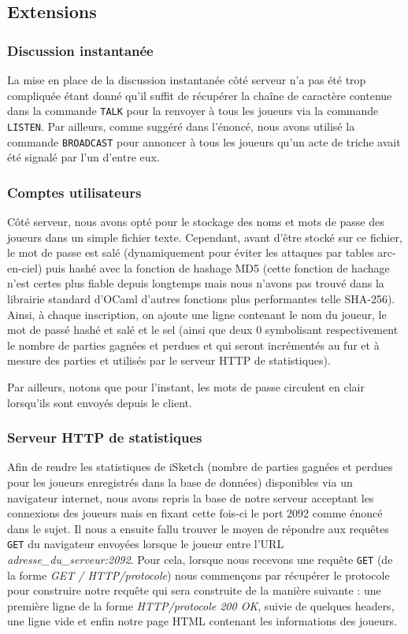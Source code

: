 \documentclass[a4paper, 11pt]{article}
\begin{document}
\subsection {Extensions}

\subsubsection{Discussion instantanée}

La mise en place de la discussion instantanée côté serveur n’a pas
été trop compliquée étant donné qu’il suffit de récupérer la chaîne de
caractère contenue dans la commande \verb+TALK+ pour la renvoyer à
tous les joueurs via la commande \verb+LISTEN+. Par ailleurs, comme
suggéré dans l’énoncé, nous avons utilisé la commande
\verb+BROADCAST+ pour annoncer à tous les joueurs qu’un acte de triche
avait été signalé par l’un d’entre eux.

\subsubsection {Comptes utilisateurs}

Côté serveur, nous avons opté pour le stockage des noms et mots de
passe des joueurs dans un simple fichier texte. Cependant, avant
d'être stocké sur ce fichier, le mot de passe est salé (dynamiquement
pour éviter les attaques par tables arc-en-ciel) puis hashé avec la
fonction de hashage MD5 (cette fonction de hachage n'est certes plus
fiable depuis longtemps mais nous n’avons pas trouvé dans la librairie
standard d'OCaml d’autres fonctions plus performantes telle SHA-256).
Ainsi, à chaque inscription, on ajoute une ligne contenant le nom du
joueur, le mot de passé hashé et salé et le sel (ainsi que deux 0
symbolisant respectivement le nombre de parties gagnées et perdues et
qui seront incrémentés au fur et à mesure des parties et utilisés par
le serveur HTTP de statistiques).

\bigskip Par ailleurs, notons que pour l’instant, les mots de passe
circulent en clair lorsqu’ils sont envoyés depuis le client.

\subsubsection {Serveur HTTP de statistiques}

Afin de rendre les statistiques de iSketch (nombre de parties gagnées
et perdues pour les joueurs enregistrés dans la base de données)
disponibles via un navigateur internet, nous avons repris la base de
notre serveur acceptant les connexions des joueurs mais en fixant
cette fois-ci le port 2092 comme énoncé dans le sujet. Il nous a
ensuite fallu trouver le moyen de répondre aux requêtes \verb+GET+ du
navigateur envoyées lorsque le joueur entre l’URL
\textit{adresse\_du\_serveur:2092}. Pour cela, lorsque nous recevons
une requête \verb+GET+ (de la forme \textit{GET / HTTP/protocole})
nous commençons par récupérer le protocole pour construire notre
requête qui sera construite de la manière suivante : une première
ligne de la forme \textit{HTTP/protocole 200 OK}, suivie de quelques
headers, une ligne vide et enfin notre page HTML contenant les
informations des joueurs.
\end{document}
